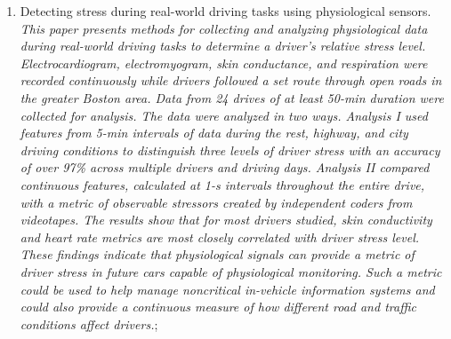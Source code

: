 \begin{enumerate}
\item Detecting stress during real-world driving tasks using physiological sensors.
\small\textit{This paper presents methods for collecting and analyzing physiological data during real-world driving tasks to determine a driver's relative stress level. Electrocardiogram, electromyogram, skin conductance, and respiration were recorded continuously while drivers followed a set route through open roads in the greater Boston area. Data from 24 drives of at least 50-min duration were collected for analysis. The data were analyzed in two ways. Analysis I used features from 5-min intervals of data during the rest, highway, and city driving conditions to distinguish three levels of driver stress with an accuracy of over 97\% across multiple drivers and driving days. Analysis II compared continuous features, calculated at 1-s intervals throughout the entire drive, with a metric of observable stressors created by independent coders from videotapes. The results show that for most drivers studied, skin conductivity and heart rate metrics are most closely correlated with driver stress level. These findings indicate that physiological signals can provide a metric of driver stress in future cars capable of physiological monitoring. Such a metric could be used to help manage noncritical in-vehicle information systems and could also provide a continuous measure of how different road and traffic conditions affect drivers.};


\end{enumerate}

